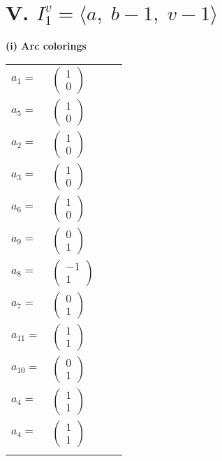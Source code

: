 \documentclass[1p]{elsarticle_modified}
\theoremstyle{definition}
\begin{document}
\centering \section*{V. $I^v_{1}= \langle a,\;b-1,\;v-1 \rangle$}
\flushleft \textbf{(i) Arc colorings}\\
\begin{tabular}{m{7pt} m{180pt} m{7pt} m{180pt} }
\flushright $a_{1}=$&$\begin{pmatrix}1\\0\end{pmatrix}$ \\
\flushright $a_{5}=$&$\begin{pmatrix}1\\0\end{pmatrix}$ \\
\flushright $a_{2}=$&$\begin{pmatrix}1\\0\end{pmatrix}$ \\
\flushright $a_{3}=$&$\begin{pmatrix}1\\0\end{pmatrix}$ \\
\flushright $a_{6}=$&$\begin{pmatrix}1\\0\end{pmatrix}$ \\
\flushright $a_{9}=$&$\begin{pmatrix}0\\1\end{pmatrix}$ \\
\flushright $a_{8}=$&$\begin{pmatrix}-1\\1\end{pmatrix}$ \\
\flushright $a_{7}=$&$\begin{pmatrix}0\\1\end{pmatrix}$ \\
\flushright $a_{11}=$&$\begin{pmatrix}1\\1\end{pmatrix}$ \\
\flushright $a_{10}=$&$\begin{pmatrix}0\\1\end{pmatrix}$ \\
\flushright $a_{4}=$&$\begin{pmatrix}1\\1\end{pmatrix}$\\ \flushright $a_{4}=$&$\begin{pmatrix}1\\1\end{pmatrix}$\\&\end{tabular}
\end{document}
